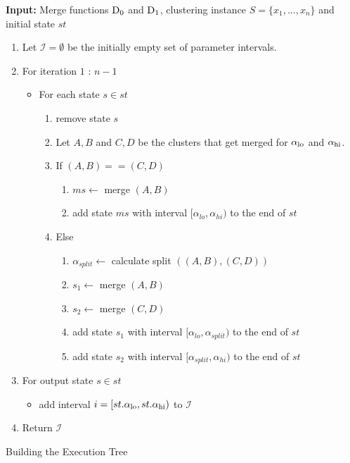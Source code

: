 \begin{algorithm}
    \textbf{Input:} Merge functions $\operatorname{D_{0}}$ and $\operatorname{D_{1}}$, clustering instance $S = \{x_1, \dots, x_n\}$ and initial state $st$
    \begin{enumerate}[nosep, leftmargin=*]
    \item Let $\mathcal{I} = \emptyset$ be the initially empty set of parameter intervals.
    \item For iteration $1$ : $n-1$
        \begin{itemize}[nosep, leftmargin=*]
        \item For each state $s \in st$
            \begin{enumerate}[nosep, leftmargin=*]
                \item remove state $s$
                \item Let $A, B$ and $C, D$ be the clusters that get merged for $\alpha_\text{lo}$ and $\alpha_\text{hi}$.
                \item If $(A,B) == (C,D)$
                \begin{enumerate}[nosep, leftmargin=*]
                    \item $ms \gets$ merge $(A, B)$\;
                    \item add state $ms$ with interval $[\alpha_{lo},\alpha_{hi})$ to the end of $st$
                \end{enumerate}
                \item Else
                \begin{enumerate}[nosep, leftmargin=*]
                    \item $\alpha_{split} \gets$ calculate split $((A, B), (C, D))$
                    \item $s_1 \gets$ merge $(A,B)$
                    \item $s_2 \gets$ merge $(C, D)$
                    \item add state $s_1$ with interval $[\alpha_{lo},\alpha_{split})$ to the end of $st$
                    \item add state $s_2$ with interval $[\alpha_{split},\alpha_{hi})$ to the end of $st$
                \end{enumerate}
            \end{enumerate}
        \end{itemize}
        \item For output state $s \in st$
            \begin{itemize}
                \item add interval $i = [st.\alpha_\text{lo}, st.\alpha_\text{hi})$ to $\mathcal{I}$
            \end{itemize}
        \item Return $\mathcal{I}$
    \end{enumerate}  
    \caption{Building the Execution Tree}
    \label{alg:alphalinkage1}
\end{algorithm}

